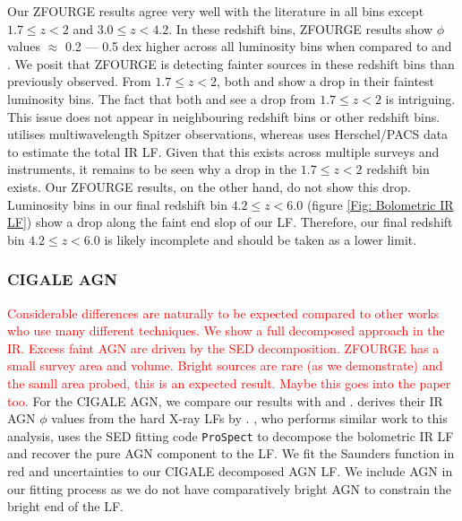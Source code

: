 Our ZFOURGE results agree very well with the literature in all bins except $1.7 \leq z < 2$ and $3.0 \leq z < 4.2$. In these redshift bins, ZFOURGE results show $\phi$ values $\approx$ 0.2 --- 0.5 dex higher across all luminosity bins when compared to \cite{rodighiero_mid-_2010} and \cite{gruppioni_herschel_2013}. We posit that ZFOURGE is detecting fainter sources in these redshift bins than previously observed. From $1.7 \leq z < 2$, both \cite{rodighiero_mid-_2010} and \cite{gruppioni_herschel_2013} show a drop in their faintest luminosity bins. The fact that both \cite{gruppioni_herschel_2013} and \cite{rodighiero_mid-_2010} see a drop from $1.7 \leq z < 2$ is intriguing. This issue does not appear in neighbouring redshift bins or other redshift bins. \cite{rodighiero_mid-_2010} utilises multiwavelength Spitzer observations, whereas \cite{gruppioni_herschel_2013} uses Herschel/PACS data to estimate the total IR LF. Given that this exists across multiple surveys and instruments, it remains to be seen why a drop in the $1.7 \leq z < 2$ redshift bin exists. Our ZFOURGE results, on the other hand, do not show this drop. Luminosity bins in our final redshift bin $4.2 \leq z < 6.0$ (figure \ref{Fig: Bolometric IR LF}) show a drop along the faint end slop of our LF. Therefore, our final redshift bin $4.2 \leq z < 6.0$ is likely incomplete and should be taken as a lower limit.

\subsubsection{CIGALE AGN}
\textcolor{red}{Considerable differences are naturally to be expected compared to other works who use many different techniques. We show a full decomposed approach in the IR. Excess faint AGN are driven by the SED decomposition. ZFOURGE has a small survey area and volume. Bright sources are rare (as we demonstrate) and the samll area probed, this is an expected result. Maybe this goes into the paper too.} For the CIGALE AGN, we compare our results with \cite{delvecchio_tracing_2014, symeonidis_agn_2021} and \cite{thorne_deep_2022}. \cite{symeonidis_agn_2021} derives their IR AGN $\phi$ values from the hard X-ray LFs by \cite{aird_evolution_2015}. \cite{thorne_deep_2022}, who performs similar work to this analysis, uses the SED fitting code \texttt{ProSpect} \citep{leja_deriving_2017, robotham_prospect_2020} to decompose the bolometric IR LF and recover the pure AGN component to the LF. We fit the Saunders function in red and uncertainties to our CIGALE decomposed AGN LF. We include \cite{thorne_deep_2022} AGN in our fitting process as we do not have comparatively bright AGN to constrain the bright end of the LF. 

